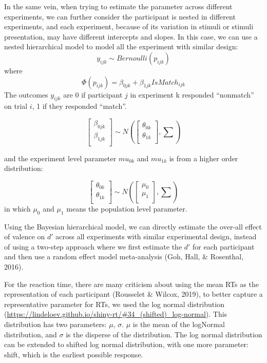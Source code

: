 \documentclass[
  english,
  man]{apa6}
\begin{document}
In the same vein, when trying to estimate the parameter across different experiments, we can further consider the participant is nested in different experiments, and each experiment, because of its variation in stimuli or stimuli presentation, may have different intercepts and slopes. In this case, we can use a nested hierarchical model to model all the experiment with similar design:
\[y_{ijk} \sim Bernoulli(p_{ijk})\]
where
\[ \Phi(p_{ijk}) =  \beta_{0jk} + \beta_{1jk}IsMatch_{ijk}\]
The outcomes \(y_{ijk}\) are 0 if participant \(j\) in experiment k responded \enquote{nonmatch} on trial \(i\), 1 if they responded \enquote{match}.

\[\begin{bmatrix}\beta_{0jk}\\
\beta_{1jk}\\
\end{bmatrix} \sim N(\begin{bmatrix}\theta_{0k}\\
\theta_{1k}\\
\end{bmatrix}, \sum)\]

and the experiment level parameter \(mu_{0k}\) and \(mu_{1k}\) is from a higher order distribution:

\[\begin{bmatrix}\theta_{0k}\\
\theta_{1k}\\
\end{bmatrix} \sim N(\begin{bmatrix}\mu_{0}\\
\mu_{1}\\
\end{bmatrix}, \sum)\]
in which \(\mu_{0}\) and \(\mu_{1}\) means the population level parameter.

Using the Bayesian hierarchical model, we can directly estimate the over-all effect of valence on \(d'\) across all experiments with similar experimental design, instead of using a two-step approach where we first estimate the \(d'\) for each participant and then use a random effect model meta-analysis (Goh, Hall, \& Rosenthal, 2016).

For the reaction time, there are many criticism about using the mean RTs as the representation of each participant (Rousselet \& Wilcox, 2019), to better capture a representative parameter for RTs, we used the log normal distribution (\url{https://lindeloev.github.io/shiny-rt/\#34_(shifted)_log-normal}). This distribution has two parameters: \(\mu\), \(\sigma\). \(\mu\) is the mean of the logNormal distribution, and \(\sigma\) is the disperse of the distribution. The log normal distribution can be extended to shifted log normal distribution, with one more parameter: shift, which is the earliest possible response.
\end{document}
